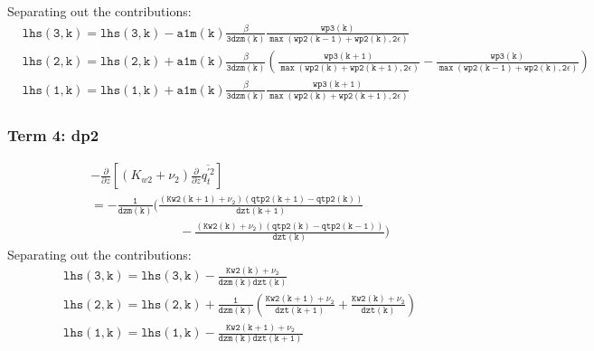 \documentclass[11pt,fleqn]{article}
\newcommand{\ptlder}[2]{\frac{\partial #1}{\partial #2}}
\begin{document}
%
Separating out the contributions:
%
\begin{equation}
\begin{split}
& \mathtt{ 
   lhs(3,k) = lhs(3,k) - a1m(k)\frac{\beta}{3 dzm(k)}
                 \frac{wp3(k)}
                      {\max\left(wp2(k-1)+wp2(k),2\epsilon\right)}
  } \\
& \mathtt{
   lhs(2,k) = lhs(2,k) + a1m(k)\frac{\beta}{3 dzm(k)}
                 \left(
                   \frac{wp3(k+1)}
                        {\max\left(wp2(k)+wp2(k+1),2\epsilon\right)}
                  -\frac{wp3(k)}
                        {\max\left(wp2(k-1)+wp2(k),2\epsilon\right)}
                 \right)
  } \\
& \mathtt{
   lhs(1,k) = lhs(1,k) + a1m(k)\frac{\beta}{3 dzm(k)}
                 \frac{wp3(k+1)}
                      {\max\left(wp2(k)+wp2(k+1),2\epsilon\right)}
  }
\end{split}
\end{equation}
 
\subsubsection{Term 4:  dp2}

\begin{equation}
\begin{split}
& - \ptlder{}{z} \left[ \left( K_{w2} + \nu_2 \right)
                        \ptlder{}{z} \overline{q_t^{'2}}
                 \right]  \\
 &= \mathtt{
    -\frac{1}{dzm(k)}
     \bigg( \frac{ \left( Kw2(k+1) + \nu_2 \right)
                   \left( qtp2(k+1) - qtp2(k) \right)} {dzt(k+1)}  }  \\
 &  \mathtt{ \qquad \qquad \qquad \quad
           -\frac{ \left( Kw2(k) + \nu_2 \right)
                   \left( qtp2(k) - qtp2(k-1) \right)} {dzt(k)}
     \bigg)
    }
\end{split}
\end{equation}
%
Separating out the contributions:
%
\begin{equation}
\begin{split}
&\mathtt{lhs(3,k) = lhs(3,k) - \frac{Kw2(k)+\nu_2}{dzm(k)dzt(k)} } \\
&\mathtt{lhs(2,k) = lhs(2,k) + \frac{1}{dzm(k)}
                               \left(   \frac{Kw2(k+1)+\nu_2}{dzt(k+1)}
                                      + \frac{Kw2(k)+\nu_2}{dzt(k)} \right) } \\
&\mathtt{lhs(1,k) = lhs(1,k) - \frac{Kw2(k+1)+\nu_2}{dzm(k)dzt(k+1)} }
\end{split}
\end{equation}
\end{document}
